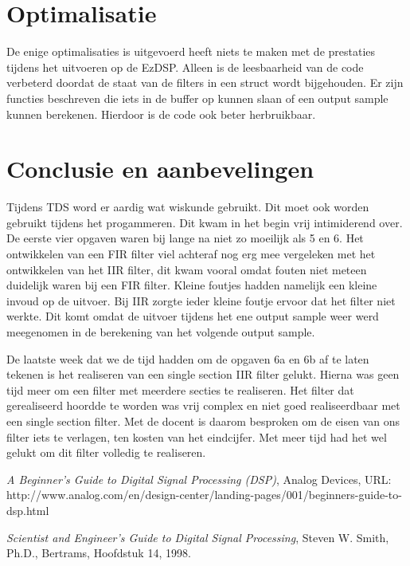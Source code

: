 \documentclass[11pt,a4paper]{article}
\begin{document}
	
	

	\section{Optimalisatie}
	De enige optimalisaties is uitgevoerd heeft niets te maken met de prestaties tijdens het uitvoeren op de EzDSP. Alleen is de leesbaarheid van de code verbeterd doordat de staat van de filters in een struct wordt bijgehouden. Er zijn functies beschreven die iets in de buffer op kunnen slaan of een output sample kunnen berekenen. Hierdoor is de code ook beter herbruikbaar. 
	
 
	\section{Conclusie en aanbevelingen}
	Tijdens TDS word er aardig wat wiskunde gebruikt. Dit moet ook worden gebruikt tijdens het progammeren. Dit kwam in het begin vrij intimiderend over. De eerste vier opgaven waren bij lange na niet zo moeilijk als 5 en 6. 
	Het ontwikkelen van een FIR filter viel achteraf nog erg mee vergeleken met het ontwikkelen van het IIR filter, dit kwam vooral omdat fouten niet meteen duidelijk waren bij een FIR filter. Kleine foutjes hadden namelijk een kleine invoud op de uitvoer. 
	Bij IIR zorgte ieder kleine foutje ervoor dat het filter niet werkte. Dit komt omdat de uitvoer tijdens het ene output sample weer werd meegenomen in de berekening van het volgende output sample.

	De laatste week dat we de tijd hadden om de opgaven 6a en 6b af te laten tekenen is het realiseren van een single section IIR filter gelukt. Hierna was geen tijd meer om een filter met meerdere secties te realiseren.
	Het filter dat gerealiseerd hoordde te worden was vrij complex en niet goed realiseerdbaar met een single section filter. Met de docent is daarom besproken om de eisen van ons filter iets te verlagen, ten kosten van het eindcijfer. Met meer tijd had het wel gelukt om dit filter volledig te realiseren. 
	
	
		
	\begin{thebibliography}{9}

  		
  		\textit{A Beginner's Guide to Digital Signal Processing (DSP)},
  		Analog Devices,
  		URL: http://www.analog.com/en/design-center/landing-pages/001/beginners-guide-to-dsp.html 
  		
  		
  		\textit{Scientist and Engineer's Guide to Digital Signal Processing},
  		Steven W. Smith, Ph.D., 
  		Bertrams,
  		Hoofdstuk 14,
  		1998.  		
		
	\end{thebibliography}
\end{document}
